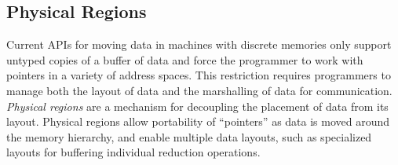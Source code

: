 \subsection{Physical Regions}
\label{subsec:phyreg}
Current APIs for moving data in machines with discrete memories only support untyped
copies of a buffer of data and force the programmer to work with pointers in a variety of address
spaces.  This restriction requires programmers to manage both the layout of
data and the marshalling of data for communication.  {\em Physical regions} are a
mechanism for decoupling the placement of data from its layout.  Physical regions allow portability
of ``pointers'' as data is moved around the memory hierarchy, and enable multiple data
layouts, such as specialized layouts for buffering individual reduction operations.




